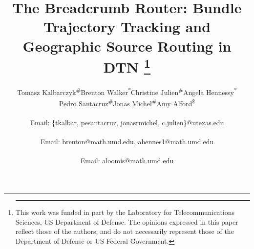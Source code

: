 \title{The Breadcrumb Router: Bundle Trajectory Tracking and Geographic Source Routing in DTN
\thanks{\hrule\vspace{0.1in} This work was funded in part by the Laboratory
for Telecommunications Sciences, US Department of Defense.  The opinions
expressed in this paper reflect those of the authors, and do not
necessarily represent those of the Department of Defense or US Federal
Government.}}

\author{
\alignauthor
Tomasz Kalbarczyk\textsuperscript{\#}\quad Brenton
Walker\textsuperscript{*}\quad Christine
Julien\textsuperscript{\#}\quad Angela
Hennessy\textsuperscript{*}\quad\\
Pedro
Santacruz\textsuperscript{\#}\quad Jonas Michel\textsuperscript{\#}\quad Amy
Alford\textsuperscript{\$}\quad \\  
\\
Email: \{tkalbar, pesantacruz, jonasrmichel, c.julien\}@utexas.edu\\
\\
Email: brenton@math.umd.edu, ahennes1@math.umd.edu\\
\\
Email: aloomis@math.umd.edu
}



\maketitle
